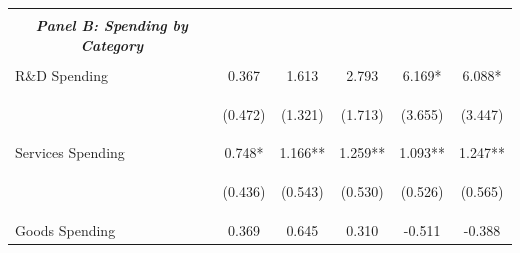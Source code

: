 \documentclass[dv_diss_main.tex]{subfiles}
\begin{document}
\begin{table}[H]
\begin{center}
{\begin{tabular}{lccccc}
    \vspace{-1.5pt} & \vspace{-1.5pt} & \vspace{-1.5pt} & \vspace{-1.5pt} & \vspace{-1.5pt} \\
    
    \multicolumn{1}{c}{\textit{\textbf{Panel B: Spending by Category}}} \\ 
    \vspace{-1.5pt} & \vspace{-1.5pt} & \vspace{-1.5pt} & \vspace{-1.5pt} & \vspace{-1.5pt} \\
    R\&D Spending & 0.367 & 1.613 & 2.793 & 6.169* & 6.088* \\
    \vspace{4pt} & \begin{footnotesize}(0.472)\end{footnotesize} & \begin{footnotesize}(1.321)\end{footnotesize} & \begin{footnotesize}(1.713)\end{footnotesize} & \begin{footnotesize}(3.655)\end{footnotesize} & \begin{footnotesize}(3.447)\end{footnotesize} \\
    Services Spending & 0.748* & 1.166** & 1.259** & 1.093** & 1.247** \\
    \vspace{4pt} & \begin{footnotesize}(0.436)\end{footnotesize} & \begin{footnotesize}(0.543)\end{footnotesize} & \begin{footnotesize}(0.530)\end{footnotesize} & \begin{footnotesize}(0.526)\end{footnotesize} & \begin{footnotesize}(0.565)\end{footnotesize} \\
    Goods Spending & 0.369 & 0.645 & 0.310 & -0.511 & -0.388 \\

\end{tabular}}
\end{center}
\end{table}
\end{document}

